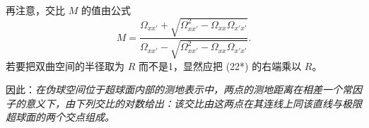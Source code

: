 再注意，交比 $M$ 的值由公式
\[
\tag{23}
 M=\frac{\Omega_{xx'}+\sqrt{\Omega_{xx'}^{2}-\Omega_{xx}\Omega_{x'x'}}}
 {\Omega_{xx'}-\sqrt{\Omega_{xx'}^{2}-\Omega_{xx}\Omega_{x'x'}}}.
\]
若要把双曲空间的半径取为 $R$ 而不是1，显然应把 (22*) 的右端乘以 $R$。

因此：\emph{在伪球空间位于超球面内部的测地表示中，两点的测地距离在相差一个常因子的意义下，由下列交比的对数给出：该交比由这两点在其连线上同该直线与极限超球面的两个交点组成。}
